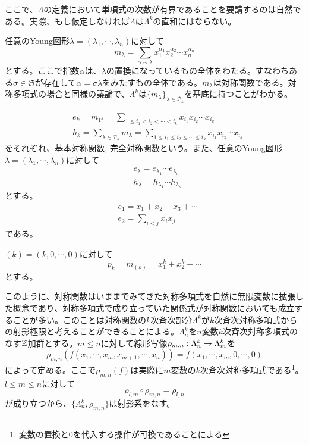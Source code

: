\documentclass{ltjsreport}
\begin{document}
ここで、$\Lambda$の定義において単項式の次数が有界であることを要請するのは自然である。実際、もし仮定しなければ$\Lambda$は$\Lambda^k$の直和にはならない。

\begin{eg}[単項対称関数]\label{monomial_sym_func}
  任意のYoung図形$\lambda=(\lambda_1,\cdots,\lambda_n)$に対して
  \[
  m_{\lambda}=\sum_{\alpha\sim\lambda}x_1^{\alpha_1}x_2^{\alpha_2}\cdots x_{n}^{\alpha_n}
  \]
  とする。ここで指数$\alpha$は、$\lambda$の置換になっているもの全体をわたる。すなわちある$\sigma\in\mathfrak{S}$が存在して$\alpha=\sigma\lambda$をみたすもの全体である。$m_\lambda$は対称関数である。対称多項式の場合と同様の議論で、$\Lambda^k$は$\{m_\lambda\}_{\lambda\in\mathcal{P}_k}$を基底に持つことがわかる。
\end{eg}

\begin{eg}
  \begin{align*}
  &e_k=m_{1^k}
  =\sum_{1\leq i_1<i_2<\cdots<i_k}x_{i_1}x_{i_2}\cdots x_{i_k}\\
  &h_k=\sum_{\lambda\in\mathcal{P}_k} m_\lambda
  =\sum_{1\leq i_1\leq i_2\leq \cdots\leq i_k}x_{i_1}x_{i_2}\cdots x_{i_k}
  \end{align*}
  をそれぞれ、基本対称関数, 完全対称関数という。また、任意のYoung図形$\lambda=(\lambda_1,\cdots,\lambda_n)$に対して
  \begin{align*}
    &e_\lambda=e_{\lambda_1}\cdots e_{\lambda_n}\\
    &h_\lambda=h_{\lambda_1}\cdots h_{\lambda_n}
  \end{align*}
  とする。
  \begin{align*}
    &e_1=x_1+x_2+x_3+\cdots\\
    &e_2=\sum_{i<j}x_ix_j
  \end{align*}
  である。
\end{eg}

\begin{eg}[べき和対称関数]
  $(k)=(k,0,\cdots,0)$に対して
  \[
  p_{k}=m_{(k)}=x_1^k+x_2^k+\cdots
  \]
  とする。
\end{eg}

このように、対称関数はいままでみてきた対称多項式を自然に無限変数に拡張した概念であり、対称多項式で成り立っていた関係式が対称関数においても成立することが多い。このことは対称関数の$k$次斉次部分$\Lambda^k$が$k$次斉次対称多項式からの射影極限と考えることができることによる。$\Lambda_n^k$を$n$変数$k$次斉次対称多項式のなす$\mathbb{Z}$加群とする。$m\leq n$に対して線形写像$\rho_{m,n}:\Lambda^k_n\rightarrow\Lambda^k_m$を
\[
\rho_{m,n}(f(x_1,\cdots,x_m,x_{m+1},\cdots,x_n))=f(x_1,\cdots,x_m,0,\cdots,0)  
\]
によって定める。ここで$\rho_{m,n}(f)$は実際に$m$変数の$k$次斉次対称多項式である\footnote{変数の置換と$0$を代入する操作が可換であることによる}。$l\leq m\leq n$に対して
\[
\rho_{l,m}\circ\rho_{m,n}=\rho_{l,n}  
\]
が成り立つから、$\{\Lambda^k_n,\rho_{m,n}\}$は射影系をなす。
\end{document}
